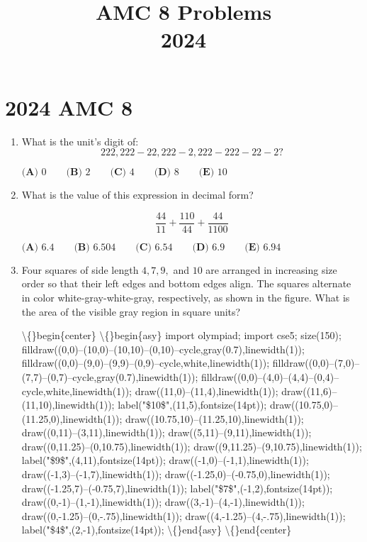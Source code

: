 \documentclass{article}
\title{AMC 8 Problems \\ 2024}
\date{}
\begin{document}
\maketitle\thispagestyle{fancy}\newpage\section*{2024 AMC 8}\begin{enumerate}[label=\arabic*., itemsep=0.5em]\item What is the unit's digit of: 
\begin{equation*}
222{,}222-22{,}222-2{,}222-222-22-2?
\end{equation*}

\(\textbf{(A) } 0\qquad\textbf{(B) } 2\qquad\textbf{(C) } 4\qquad\textbf{(D) } 8\qquad\textbf{(E) } 10\)\par \vspace{0.5em}\item What is the value of this expression in decimal form?

\begin{equation*}
\frac{44}{11} + \frac{110}{44} + \frac{44}{1100}
\end{equation*}

\(\textbf{(A) } 6.4\qquad\textbf{(B) } 6.504\qquad\textbf{(C) } 6.54\qquad\textbf{(D) } 6.9\qquad\textbf{(E) } 6.94\)\par \vspace{0.5em}\item Four squares of side length \(4, 7, 9,\) and \(10\) are arranged in increasing size order so that their left edges and bottom edges align. The squares alternate in color white-gray-white-gray, respectively, as shown in the figure. What is the area of the visible gray region in square units?

\textbackslash\{\}begin\{center\}
\textbackslash\{\}begin\{asy\}
import olympiad;
import cse5;
size(150);
filldraw((0,0)--(10,0)--(10,10)--(0,10)--cycle,gray(0.7),linewidth(1));
filldraw((0,0)--(9,0)--(9,9)--(0,9)--cycle,white,linewidth(1));
filldraw((0,0)--(7,0)--(7,7)--(0,7)--cycle,gray(0.7),linewidth(1));
filldraw((0,0)--(4,0)--(4,4)--(0,4)--cycle,white,linewidth(1));
draw((11,0)--(11,4),linewidth(1));
draw((11,6)--(11,10),linewidth(1));
label("\$10\$",(11,5),fontsize(14pt));
draw((10.75,0)--(11.25,0),linewidth(1));
draw((10.75,10)--(11.25,10),linewidth(1));
draw((0,11)--(3,11),linewidth(1));
draw((5,11)--(9,11),linewidth(1));
draw((0,11.25)--(0,10.75),linewidth(1));
draw((9,11.25)--(9,10.75),linewidth(1));
label("\$9\$",(4,11),fontsize(14pt));
draw((-1,0)--(-1,1),linewidth(1));
draw((-1,3)--(-1,7),linewidth(1));
draw((-1.25,0)--(-0.75,0),linewidth(1));
draw((-1.25,7)--(-0.75,7),linewidth(1));
label("\$7\$",(-1,2),fontsize(14pt));
draw((0,-1)--(1,-1),linewidth(1));
draw((3,-1)--(4,-1),linewidth(1));
draw((0,-1.25)--(0,-.75),linewidth(1));
draw((4,-1.25)--(4,-.75),linewidth(1));
label("\$4\$",(2,-1),fontsize(14pt));
\textbackslash\{\}end\{asy\}
\textbackslash\{\}end\{center\}


\end{enumerate}
\end{document}
